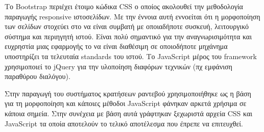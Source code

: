Το Bootstrap περιέχει έτοιμο κώδικα CSS ο οποίος ακολουθεί την μεθοδολογία παραγωγής responsive ιστοσελίδων. Με την έννοια αυτή εννοείται ότι η μορφοποίηση των σελίδων στοχεύει στο να είναι συμβατή με οποιαδήποτε συσκευή, λειτουργικό σύστημα και περιηγητή ιστού. Είναι πολύ σημαντικό για την αναγνωρισιμότητα και ευχρηστία μιας εφαρμογής το να είναι διαθέσιμη σε οποιοδήποτε μηχάνημα υποστηρίζει τα τελευταία standards του ιστού. Το JavaScript μέρος του framework χρησιμοποιεί το jQuery για την υλοποίηση διαφόρων τεχνικών (πχ εμφάνιση παραθύρου διαλόγου).

Στην παραγωγή του συστήματος κρατήσεων ραντεβού χρησιμοποιήθηκε ως η βάση για τη μορφοποίηση και κάποιες μέθοδοι JavaScript φάνηκαν αρκετά χρήσιμα σε κάποια σημεία. Στην συνέχεια με βάση αυτά γράφτηκαν ξεχωριστά αρχεία CSS και JavaScript τα οποία αποτελούν το τελικό αποτέλεσμα που έπρεπε να επιτευχθεί. 